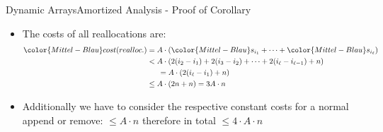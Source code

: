 
\begin{frame}{Dynamic Arrays}{Amortized Analysis - Proof of Corollary}
  \begin{itemize}
    \item
      The {\color{Mittel-Blau}costs} of all reallocations are:
      \begin{align*}
        {\color{Mittel-Blau}cost}(realloc.)
          & = A \cdot \left(
              {\color{Mittel-Blau}s_{i_1}}+\dots+{\color{Mittel-Blau}s_{i_\ell}}
            \right)\\
          & < A \cdot \left(
              2(i_2-i_1)+2(i_3-i_2)+\dots+2(i_\ell-i_{\ell-1}) + n
            \right)\\
          & \hspace{1.5em} = A \cdot \left(
              2 (i_\ell - i_1) + n
            \right)\\
          & \leq A \cdot \left(2n + n\right) = 3A \cdot n
      \end{align*}
    \item
      Additionally we have to consider the respective constant costs for
      a normal append or remove: {\color{Mittel-Blau}$\leq A \cdot n$} therefore in total {\color{Mittel-Blau}$\leq 4 \cdot A \cdot n$}
  \end{itemize}
\end{frame}


